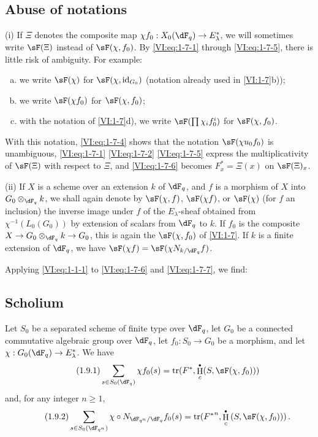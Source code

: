 \documentclass[oneside]{book}
\DeclareMathOperator{\h}{H}
\DeclareMathOperator{\tr}{tr}
\theoremstyle{sga-source}
\theoremstyle{sga-source-dash}
\theoremstyle{sga-source-dotdash}
\theoremstyle{sga-source-number-note-dash}
\theoremstyle{sga-source-note-number-dotdash}
\theoremstyle{sga-source-example-dotdash}
\theoremstyle{sga-source-inline-number}
\theoremstyle{sga-source-bare-number}
\theoremstyle{sga-source}
\let\oldbullet\bullet
\renewcommand{\bullet}{\textnormal{\tiny$\oldbullet$}}
\newcommand{\PrintPage}[1]{}\newcommand{\MathPage}[1]{}\newcommand{\PrintCite}[2]{#1}\newcommand{\var}[3]{#2}
\begin{document}
\subsection{Abuse of notations}\label{VI:1-8}

(i) If $\Xi$ denotes the composite map 
$\chi f_0:X_0(\dF_q) \to E_\lambda^\ast$, we will sometimes write $\sF(\Xi)$ 
instead of $\sF(\chi,f_0)$. By \eqref{VI:eq:1-7-1} through \eqref{VI:eq:1-7-5}, 
there is little risk of ambiguity. For example:
\begin{enumerate}[a)]
  \item we write $\sF(\chi)$ for $\sF(\chi,\operatorname{id}_{G_0})$ 
    (notation already used in \ref{VI:1-7}b)); 
  \item we write $\sF(\chi f_0)$ for $\sF(\chi,f_0)$;
  \item with the notation of \ref{VI:1-7}d), we write 
    $\sF(\prod \chi_i f_0^i)$ for $\var{\sF(\chi,f)}{\sF(\chi,f_0)}{S45-SOL-0690}$. 
\end{enumerate}

\PrintPage{174}
With this notation, \eqref{VI:eq:1-7-4} shows that the notation 
$\sF(\chi u_0 f_0)$ is unambiguous, \eqref{VI:eq:1-7-1} \eqref{VI:eq:1-7-2} 
\eqref{VI:eq:1-7-5} express the multiplicativity of $\sF(\Xi)$ with respect to $\Xi$, 
and \eqref{VI:eq:1-7-6} becomes $F_x^\ast = \Xi(x)$ on $\sF(\Xi)_x$.

(ii) If $X$ is a scheme over an extension $k$ of $\dF_q$, and $f$ is a 
morphism of $X$ into $G_0\otimes_{\dF_q} k$, we shall again denote by $\sF(\chi,f)$, 
$\sF(\chi f)$, or $\sF(\chi)$ (for $f$ an inclusion) the inverse image under 
$f$ of the $E_\lambda$-sheaf obtained from $\chi^{-1}(L_0(G_0))$ by extension of 
scalars from $\dF_q$ to $k$. If $f_0$ is the composite 
$X\to G_0\otimes_{\dF_q} k \to G_0$, this is again the $\sF(\chi,f_0)$ of 
\ref{VI:1-7}. If $k$ is a finite extension of $\dF_q$, we have 
$\sF(\chi f) = \sF(\chi N_{k/\dF_q} f)$. 

Applying \eqref{VI:eq:1-1-1} to \eqref{VI:eq:1-7-6} and \eqref{VI:eq:1-7-7}, 
we find: 





\subsection{Scholium}\label{VI:1-9}
Let $S_0$ be a separated scheme of finite type over $\dF_q$, let $G_0$ be a 
connected commutative algebraic group over $\dF_q$, let $f_0:S_0\to G_0$ be a morphism, and let 
$\chi:G_0(\dF_q) \to E_\lambda^\ast$. We have 
\begin{equation*}\tag{1.9.1}\label{VI:eq:1-9-1}
  \sum_{s\in S_0(\dF_q)} \chi f_0(s) = \tr(F^\ast,\h_c^\bullet(S,\sF(\chi,f_0))) 
\end{equation*}
and, for any integer $n\geqslant 1$,
\begin{equation*}\tag{1.9.2}\label{VI:eq:1-9-2}
  \sum_{s\in S_0(\dF_{q^n})} \chi\circ N_{\dF_{q^n}/\dF_q} f_0(s) = \tr({F^\ast}^n, \h_c^\bullet\left(S,\sF(\chi,f_0))\right) \text{.}
\end{equation*}
\end{document}
